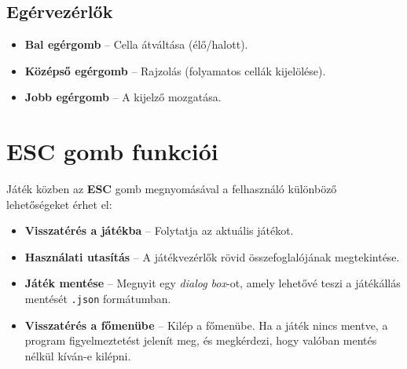 \documentclass[a4paper,12pt]{article}
\begin{document}
\subsection*{Egérvezérlők}
\begin{itemize}
    \item \textbf{Bal egérgomb} – Cella átváltása (élő/halott).
    \item \textbf{Középső egérgomb} – Rajzolás (folyamatos cellák kijelölése).
    \item \textbf{Jobb egérgomb} – A kijelző mozgatása.
\end{itemize}

\section*{ESC gomb funkciói}
Játék közben az \textbf{ESC} gomb megnyomásával a felhasználó különböző lehetőségeket érhet el:
\begin{itemize}
    \item \textbf{Visszatérés a játékba} – Folytatja az aktuális játékot.
    \item \textbf{Használati utasítás} – A játékvezérlők rövid összefoglalójának megtekintése.
    \item \textbf{Játék mentése} – Megnyit egy \textit{dialog box}-ot, amely lehetővé teszi a játékállás mentését \texttt{.json} formátumban.
    \item \textbf{Visszatérés a főmenübe} – Kilép a főmenübe. Ha a játék nincs mentve, a program figyelmeztetést jelenít meg, és megkérdezi, hogy valóban mentés nélkül kíván-e kilépni.
\end{itemize}
\end{document}
